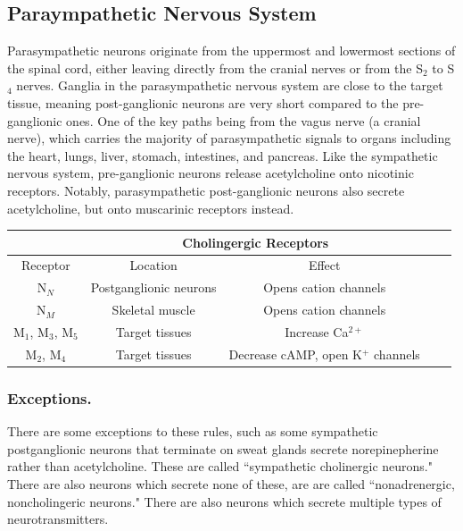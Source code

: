 \documentclass[12pt]{report}
\begin{document}
\subsection{Paraympathetic Nervous System}
Parasympathetic neurons originate from the uppermost and lowermost sections of the spinal cord, either leaving directly from the cranial nerves or from the S$_2$ to S$_4$ nerves. Ganglia in the parasympathetic nervous system are close to the target tissue, meaning post-ganglionic neurons are very short compared to the pre-ganglionic ones. One of the key paths being from the vagus nerve (a cranial nerve), which carries the majority of parasympathetic signals to organs including the heart, lungs, liver, stomach, intestines, and pancreas. Like the sympathetic nervous system, pre-ganglionic neurons release acetylcholine onto nicotinic receptors. Notably, parasympathetic post-ganglionic neurons also secrete acetylcholine, but onto muscarinic receptors instead. 


\begin{table}[!htbp]
\centering
\begin{tabular}{*5c}
\toprule
{} &  \multicolumn{2}{c}{Cholingergic Receptors} & {}\\
\midrule
{Receptor}   & Location & Effect \\
\midrule
N$_N$  &  Postganglionic neurons & Opens cation channels   \\
N$_M$  &  Skeletal muscle  & Opens cation channels  \\
M$_1$, M$_3$, M$_5$   &  Target tissues   & Increase Ca$^{2+}$   \\
M$_2$, M$_4$   &  Target tissues   & Decrease cAMP, open K$^+$ channels   \\
\bottomrule
\end{tabular}
\end{table}


\subsubsection{Exceptions.}
There are some exceptions to these rules, such as some sympathetic postganglionic neurons that terminate on sweat glands secrete norepinepherine rather than acetylcholine. These are called ``sympathetic cholinergic neurons." There are also neurons which secrete none of these, are are called ``nonadrenergic, noncholingeric neurons." There are also neurons which secrete multiple types of neurotransmitters. 
\end{document}
